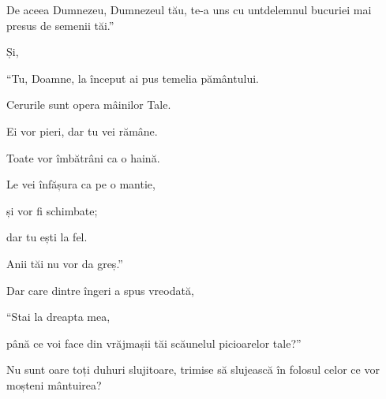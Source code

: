 {\par }{\QB De aceea Dumnezeu, Dumnezeul tău, te-a uns cu untdelemnul bucuriei mai presus de semenii tăi.”


\par }{\PP {}Și,

\par }{\Q “Tu, Doamne, la început ai pus temelia pământului.

\par }{\QB Cerurile sunt opera mâinilor Tale.


\par }{\Q {}Ei vor pieri, dar tu vei rămâne.

\par }{\QB Toate vor îmbătrâni ca o haină.


\par }{\Q {}Le vei înfășura ca pe o mantie,

\par }{\QB și vor fi schimbate;

\par }{\QB dar tu ești la fel.

\par }{\QB Anii tăi nu vor da greș.”


\par }{\PP {}Dar care dintre îngeri a spus vreodată,

\par }{\Q “Stai la dreapta mea,

\par }{\QB până ce voi face din vrăjmașii tăi scăunelul picioarelor tale?”


\par }{\PP {}Nu sunt oare toți duhuri slujitoare, trimise să slujească în folosul celor ce vor moșteni mântuirea?



\par }
